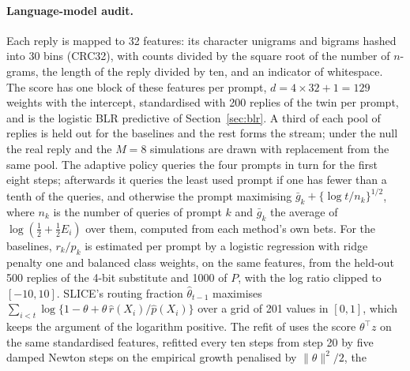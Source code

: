
\paragraph{Language-model audit.} Each reply is mapped to 32 features: its
character unigrams and bigrams hashed into 30 bins (CRC32), with counts divided
by the square root of the number of $n$-grams, the length of the reply divided
by ten, and an indicator of whitespace. The score has one block of these
features per prompt, $d = 4 \times 32 + 1 = 129$ weights with the intercept,
standardised with 200 replies of the twin per prompt, and is the logistic
BLR predictive of Section~\ref{sec:blr}. A third of each pool of replies is
held out for the baselines and the rest forms the stream; under the null the
real reply and the $M = 8$ simulations are drawn with replacement from the same
pool. The adaptive policy queries the four prompts in turn for the first eight
steps; afterwards it queries the least used prompt if one has fewer than a
tenth of the queries, and otherwise the prompt maximising
$\bar g_k + \{\log t / n_k\}^{1/2}$, where $n_k$ is the number of queries of prompt
$k$ and $\bar g_k$ the average of $\log(\frac12 + \frac12 E_i)$ over them, computed
from each method's own bets. For the baselines, $r_k/p_k$ is estimated per
prompt by a logistic regression with ridge penalty one and balanced class
weights, on the same features, from the held-out 500 replies of the 4-bit
substitute and 1000 of $P$, with the log ratio clipped to $[-10, 10]$. SLICE's
routing fraction $\hat\theta_{t-1}$ maximises
$\sum_{i<t}\log\{1 - \theta + \theta\,\hat r(X_i)/\hat p(X_i)\}$ over a grid of 201
values in $[0, 1]$, which keeps the argument of the logarithm positive.
The refit of \citet{forre2026anytime} uses the score $\theta^\top z$ on the
same standardised features, refitted every ten steps from step 20 by five
damped Newton steps on the empirical growth penalised by $\|\theta\|^2/2$, the
